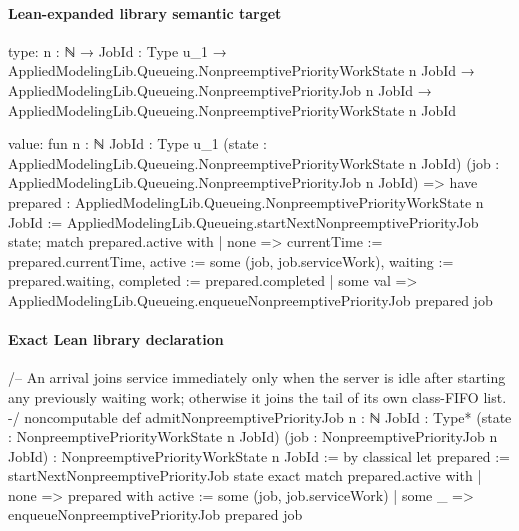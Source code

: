 \documentclass[10pt]{article}
\begin{document}
\paragraph{Lean-expanded library semantic target}
\begin{ReviewVerbatim}
type:
{n : ℕ} →
  {JobId : Type u_1} →
    AppliedModelingLib.Queueing.NonpreemptivePriorityWorkState n JobId →
      AppliedModelingLib.Queueing.NonpreemptivePriorityJob n JobId →
        AppliedModelingLib.Queueing.NonpreemptivePriorityWorkState n JobId

value:
fun {n : ℕ} {JobId : Type u_1} (state : AppliedModelingLib.Queueing.NonpreemptivePriorityWorkState n JobId)
    (job : AppliedModelingLib.Queueing.NonpreemptivePriorityJob n JobId) =>
  have prepared : AppliedModelingLib.Queueing.NonpreemptivePriorityWorkState n JobId :=
    AppliedModelingLib.Queueing.startNextNonpreemptivePriorityJob state;
  match prepared.active with
  | none =>
    { currentTime := prepared.currentTime, active := some (job, job.serviceWork), waiting := prepared.waiting,
      completed := prepared.completed }
  | some val => AppliedModelingLib.Queueing.enqueueNonpreemptivePriorityJob prepared job
\end{ReviewVerbatim}

\paragraph{Exact Lean library declaration}
\begin{ReviewVerbatim}
/-- An arrival joins service immediately only when the server is idle after
starting any previously waiting work; otherwise it joins the tail of its own
class-FIFO list. -/
noncomputable def admitNonpreemptivePriorityJob
    {n : ℕ} {JobId : Type*}
    (state : NonpreemptivePriorityWorkState n JobId)
    (job : NonpreemptivePriorityJob n JobId) :
    NonpreemptivePriorityWorkState n JobId :=
  by
    classical
    let prepared := startNextNonpreemptivePriorityJob state
    exact match prepared.active with
    | none => { prepared with active := some (job, job.serviceWork) }
    | some _ => enqueueNonpreemptivePriorityJob prepared job
\end{ReviewVerbatim}
\end{document}
